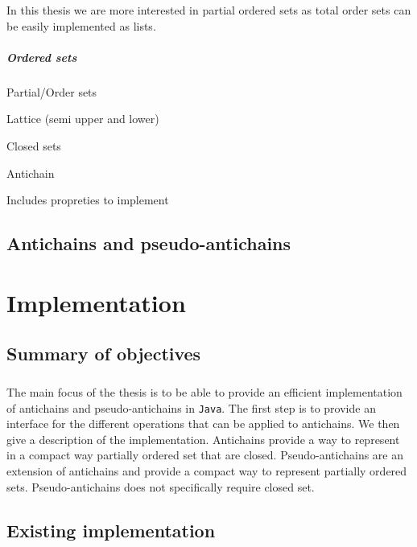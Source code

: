 \documentclass[letterpaper]{memoir}
\begin{document}

In this thesis we are more interested in partial ordered sets as
total order sets can be easily implemented as lists.

\paragraph{Ordered sets}

Partial/Order sets

Lattice (semi upper and lower)

Closed sets

Antichain

Includes propreties to implement

\section{Antichains and pseudo-antichains}

\chapter{Implementation}


\section{Summary of objectives}

\paragraph{}


The main focus of the thesis is to be able to provide an efficient
implementation of antichains and pseudo-antichains in \texttt{Java}.
The first step is to provide an interface for the different operations that
can be applied to antichains. We then give a description of the implementation.
Antichains provide a way to represent
in a compact way partially ordered set that are closed. Pseudo-antichains
are an extension of antichains and provide a compact way to represent
partially ordered sets. Pseudo-antichains does not specifically require
closed set.



\section{Existing implementation}
\end{document}

